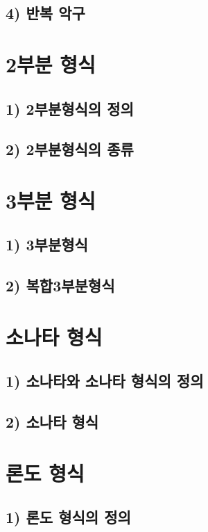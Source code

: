 \documentclass[12pt, a4paper, oneside]{book}
\let\stdsection\section
\renewcommand\section{\newpage\stdsection}
\begin{document}
	\subsection{4) 반복 악구}


	\section{2부분 형식}

	\subsection{1) 2부분형식의 정의}

	\subsection{2) 2부분형식의 종류}


	\section{3부분 형식}

	\subsection{1) 3부분형식}

	\subsection{2) 복합3부분형식}

	\section{소나타 형식}


	\subsection{1) 소나타와 소나타 형식의 정의}

	\subsection{2) 소나타 형식}


	\section{론도 형식}

	\subsection{1) 론도 형식의 정의}
\end{document}
